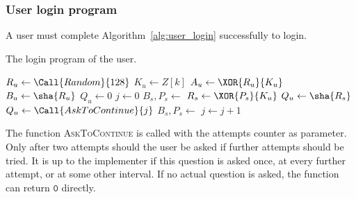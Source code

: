 \subsubsection{User login program}
A user must complete Algorithm~\vref{alg:user_login} successfully to login.
\begin{algorithm}
\caption{The login program of the user.}
\label{alg:user_login}
\begin{algorithmic}[1]
\State $R_u\gets\Call{Random}{128}$
\State $K_u\gets Z[k]$
\State $A_u\gets\XOR{R_u}{K_u}$
\State $B_u\gets\sha{R_u}$
\State $Q_u\gets 0$
\State $j\gets 0$
\State $B_s,P_s\gets$
\State $R_s\gets\XOR{P_s}{K_u}$
\State $Q_u\gets\sha{R_s}$
\Else
\State $Q_u\gets\Call{AskToContinue}{j}$
\EndIf
\State $B_s,P_s\gets$
\State $j\gets j+1$
\EndWhile
{} 
 
 
\State{} 
\EndIf
\EndIf
\EndIf
\EndProcedure
\end{algorithmic}
\end{algorithm}
The function \textsc{AskToContinue} is called with the attempts counter as parameter.
Only after two attempts should the user be asked if further attempts should be tried.
It is up to the implementer if this question is asked once,
at every further attempt,
or at some other interval.
If no actual question is asked,
the function can return $\mathtt{0}$ directly.
